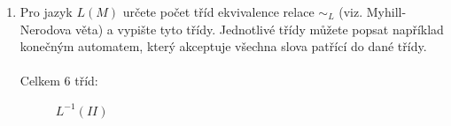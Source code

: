 \documentclass[a4paper,11pt]{article}[24.3.2010]
\begin{document}
\begin{enumerate}
\begin{enumerate}
   \item Pro jazyk $L(M)$ určete počet tříd ekvivalence relace $\sim_{L}$ (viz. Myhill-Nerodova věta) a vypište tyto třídy. Jednotlivé třídy můžete popsat například konečným automatem, který akceptuje všechna slova patřící do dané třídy.\\\\
   Celkem 6 tříd:\\
   


\begin{figure}[htbp]
 \begin{minipage}{0.5\linewidth}
  \centering
  \caption{$L^{-1}(I)$}
 \end{minipage}%
 \begin{minipage}{0.5\linewidth}
  \centering
  \caption{$L^{-1}(II)$}
 \end{minipage}
\end{figure} 


\end{enumerate}
\end{enumerate}
\end{document}
